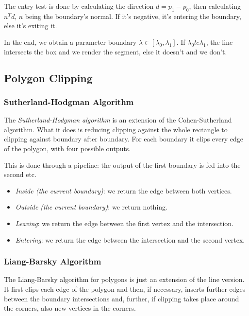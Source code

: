 \documentclass{panikzettel}
\begin{document}
The entry test is done by calculating the direction $d = p_1 - p_0$, then calculating $n^Td$, $n$ being the boundary's normal. If it's negative, it's entering the boundary, else it's exiting it.

In the end, we obtain a parameter boundary $\lambda \in [\lambda_0,\lambda_1]$. If $\lambda_0 le \lambda_1$, the line intersects the box and we render the segment, else it doesn't and we don't.

\subsection{Polygon Clipping}

\subsubsection*{Sutherland-Hodgman Algorithm}

\begin{halfboxl}
The \emph{Sutherland-Hodgman algorithm} is an extension of the Cohen-Sutherland algorithm. What it does is reducing clipping against the whole rectangle to clipping against boundary after boundary. For each boundary it clips every edge of the polygon, with four possible outputs.

This is done through a pipeline: the output of the first boundary is fed into the second etc.
\end{halfboxl}%
\begin{halfboxr}
\begin{itemize}
    \item \emph{Inside (the current boundary)}: we return the edge between both vertices.
    \item \emph{Outside (the current boundary)}: we return nothing.
    \item \emph{Leaving}: we return the edge between the first vertex and the intersection.
    \item \emph{Entering}: we return the edge between the intersection and the second vertex.
\end{itemize}
\end{halfboxr}

\subsubsection*{Liang-Barsky Algorithm}

The Liang-Barsky algorithm for polygons is just an extension of the line version. It first clips each edge of the polygon and then, if necessary, inserts further edges between the boundary intersections and, further, if clipping takes place around the corners, also new vertices in the corners.
\end{document}
